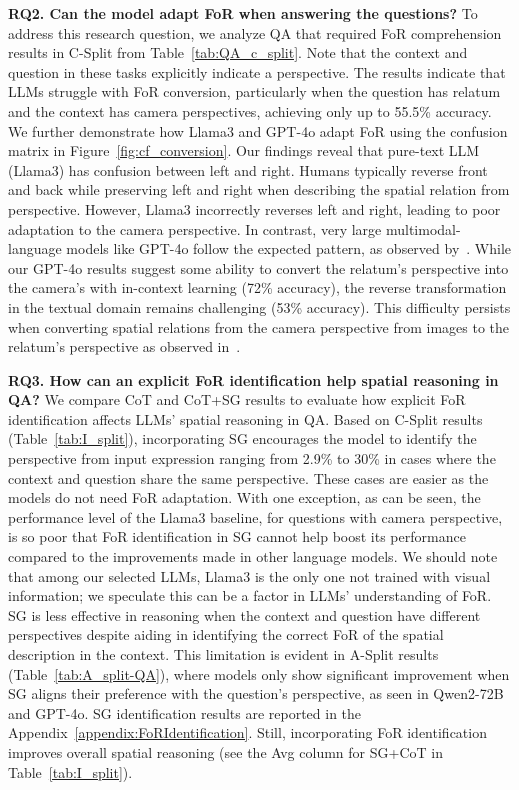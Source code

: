 \noindent\textbf{RQ2. Can the model adapt FoR when answering the questions?}
To address this research question, we analyze QA that required FoR comprehension results in C-Split from Table~\ref{tab:QA_c_split}.
Note that the context and question in these tasks explicitly indicate a perspective.
The results indicate that LLMs struggle with FoR conversion, particularly when the question has relatum and the context has camera perspectives, achieving only up to 55.5\% accuracy.
We further demonstrate how Llama3 and GPT-4o adapt FoR using the confusion matrix in Figure~\ref{fig:cf_conversion}. 
Our findings reveal that pure-text LLM (Llama3) has confusion between left and right.
Humans typically reverse front and back while preserving left and right when describing the spatial relation from perspective.
However, Llama3 incorrectly reverses left and right, leading to poor adaptation to the camera perspective.
In contrast, very large multimodal-language models like GPT-4o follow the expected pattern, as observed by~\citealt{comfortFoR}.
While our GPT-4o results suggest some ability to convert the relatum’s perspective into the camera’s with in-context learning (72\% accuracy), the reverse transformation in the textual domain remains challenging (53\% accuracy). 
This difficulty persists when converting spatial relations from the camera perspective from images to the relatum’s perspective as observed in~\citealt{comfortFoR}.

\noindent\textbf{RQ3. How can an explicit FoR identification help spatial reasoning in QA?}
We compare CoT and CoT+SG results to evaluate how explicit FoR identification affects LLMs’ spatial reasoning in QA.
Based on C-Split results (Table~\ref{tab:I_split}), incorporating SG encourages the model to identify the perspective from input expression ranging from 2.9\% to 30\% in cases where the context and question share the same perspective. 
These cases are easier as the models do not need FoR adaptation. 
With one exception, as can be seen, the performance level of the Llama3 baseline, for questions with camera perspective, is so poor that FoR identification in SG cannot help boost its performance compared to the improvements made in other language models.
We should note that among our selected LLMs, Llama3 is the only one not trained with visual information; we speculate this can be a factor in LLMs' understanding of FoR.
SG is less effective in reasoning when the context and question have different perspectives despite aiding in identifying the correct FoR of the spatial description in the context. 
This limitation is evident in A-Split results (Table~\ref{tab:A_split-QA}), where models only show significant improvement when SG aligns their preference with the question’s perspective, as seen in Qwen2-72B and GPT-4o.
SG identification results are reported in the Appendix~\ref{appendix:FoRIdentification}.
Still, incorporating FoR identification improves overall spatial reasoning (see the Avg column for SG+CoT in Table~\ref{tab:I_split}).

